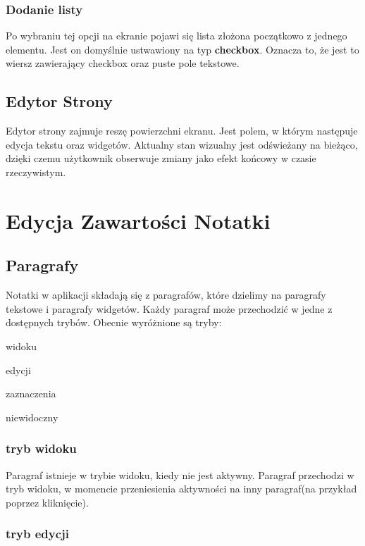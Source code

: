 \subsubsection{Dodanie listy}

Po wybraniu tej opcji na ekranie pojawi się lista złożona początkowo z jednego elementu.
Jest on domyślnie ustwawiony na typ \textbf{checkbox}. Oznacza to, że jest to wiersz zawierający checkbox oraz puste pole tekstowe.

\subsection{Edytor Strony}

Edytor strony zajmuje reszę powierzchni ekranu. Jest polem, w którym następuje edycja tekstu oraz widgetów. Aktualny stan wizualny jest odświeżany na bieżąco, dzięki czemu użytkownik obserwuje zmiany jako efekt końcowy w czasie rzeczywistym.



\section{Edycja Zawartości Notatki}

\subsection{Paragrafy}

Notatki w aplikacji składają się z paragrafów, które dzielimy na paragrafy tekstowe i paragrafy widgetów.
Każdy paragraf może przechodzić w jedne z dostępnych trybów.
Obecnie wyróżnione są tryby:

\begin{compactitem}
    \item widoku
    \item edycji
    \item zaznaczenia
    \item niewidoczny
\end{compactitem}

\subsubsection{tryb widoku}

Paragraf istnieje w trybie widoku, kiedy nie jest aktywny.
Paragraf przechodzi w tryb widoku, w momencie przeniesienia aktywności na inny paragraf(na przykład poprzez kliknięcie).

\subsubsection{tryb edycji}

